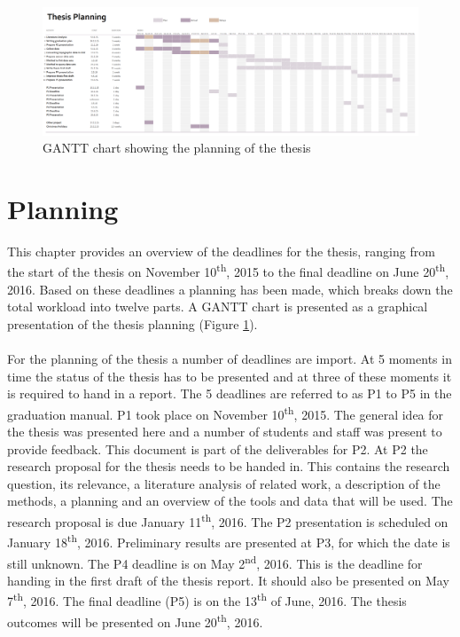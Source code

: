 

\begin{figure}
	\centering
	\includegraphics[width=1.5\linewidth, angle=90]{figs/GANTT-chart.png}
	\caption{GANTT chart showing the planning of the thesis}
	\label{fig:GANTT}
\end{figure}

\section{Planning}
\label{chap:planning}

This chapter provides an overview of the deadlines for the thesis, ranging from the start of the thesis on November 10\textsuperscript{th}, 2015 to the final deadline on June 20\textsuperscript{th}, 2016. Based on these deadlines a planning has been made, which breaks down the total workload into twelve parts. A GANTT chart is presented as a graphical presentation of the thesis planning (Figure \ref{fig:GANTT}). \\ \mbox{} \\
For the planning of the thesis a number of deadlines are import. At 5 moments in time the status of the thesis has to be presented and at three of these moments it is required to hand in a report. The 5 deadlines are referred to as P1 to P5 in the graduation manual. P1 took place on November 10\textsuperscript{th}, 2015. The general idea for the thesis was presented here and a number of students and staff was present to provide feedback. This document is part of the deliverables for P2. At P2 the research proposal for the thesis needs to be handed in. This contains the research question, its relevance, a literature analysis of related work, a description of the methods, a planning and an overview of the tools and data that will be used. The research proposal is due January 11\textsuperscript{th}, 2016. The P2 presentation is scheduled on January 18\textsuperscript{th}, 2016. Preliminary results are presented at P3, for which the date is still unknown. The P4 deadline is on May 2\textsuperscript{nd}, 2016. This is the deadline for handing in the first draft of the thesis report. It should also be presented on May 7\textsuperscript{th}, 2016. The final deadline (P5) is on the 13\textsuperscript{th} of June, 2016. The thesis outcomes will be presented on June 20\textsuperscript{th}, 2016.

